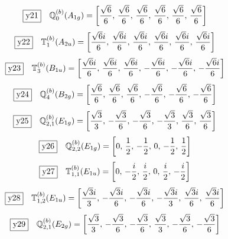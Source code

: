 \documentclass[fleqn,10pt,landscape]{jsarticle}
\begin{document}
\begin{dmath*}
\fbox{y21}\quad \mathbb{Q}_{0}^{(b)}(A_{1g})=\left[ \frac{\sqrt{6}}{6},\, \frac{\sqrt{6}}{6},\, \frac{\sqrt{6}}{6},\, \frac{\sqrt{6}}{6},\, \frac{\sqrt{6}}{6},\, \frac{\sqrt{6}}{6} \right]
\end{dmath*}
\begin{dmath*}
\fbox{y22}\quad \mathbb{T}_{1}^{(b)}(A_{2u})=\left[ \frac{\sqrt{6} i}{6},\, \frac{\sqrt{6} i}{6},\, \frac{\sqrt{6} i}{6},\, \frac{\sqrt{6} i}{6},\, \frac{\sqrt{6} i}{6},\, \frac{\sqrt{6} i}{6} \right]
\end{dmath*}
\begin{dmath*}
\fbox{y23}\quad \mathbb{T}_{3}^{(b)}(B_{1u})=\left[ \frac{\sqrt{6} i}{6},\, \frac{\sqrt{6} i}{6},\, \frac{\sqrt{6} i}{6},\, - \frac{\sqrt{6} i}{6},\, - \frac{\sqrt{6} i}{6},\, - \frac{\sqrt{6} i}{6} \right]
\end{dmath*}
\begin{dmath*}
\fbox{y24}\quad \mathbb{Q}_{4}^{(b)}(B_{2g})=\left[ \frac{\sqrt{6}}{6},\, \frac{\sqrt{6}}{6},\, \frac{\sqrt{6}}{6},\, - \frac{\sqrt{6}}{6},\, - \frac{\sqrt{6}}{6},\, - \frac{\sqrt{6}}{6} \right]
\end{dmath*}
\begin{dmath*}
\fbox{y25}\quad \mathbb{Q}_{2,1}^{(b)}(E_{1g})=\left[ \frac{\sqrt{3}}{3},\, - \frac{\sqrt{3}}{6},\, - \frac{\sqrt{3}}{6},\, - \frac{\sqrt{3}}{3},\, \frac{\sqrt{3}}{6},\, \frac{\sqrt{3}}{6} \right]
\end{dmath*}
\begin{dmath*}
\fbox{y26}\quad \mathbb{Q}_{2,2}^{(b)}(E_{1g})=\left[ 0,\, \frac{1}{2},\, - \frac{1}{2},\, 0,\, - \frac{1}{2},\, \frac{1}{2} \right]
\end{dmath*}
\begin{dmath*}
\fbox{y27}\quad \mathbb{T}_{1,1}^{(b)}(E_{1u})=\left[ 0,\, - \frac{i}{2},\, \frac{i}{2},\, 0,\, \frac{i}{2},\, - \frac{i}{2} \right]
\end{dmath*}
\begin{dmath*}
\fbox{y28}\quad \mathbb{T}_{1,2}^{(b)}(E_{1u})=\left[ \frac{\sqrt{3} i}{3},\, - \frac{\sqrt{3} i}{6},\, - \frac{\sqrt{3} i}{6},\, - \frac{\sqrt{3} i}{3},\, \frac{\sqrt{3} i}{6},\, \frac{\sqrt{3} i}{6} \right]
\end{dmath*}
\begin{dmath*}
\fbox{y29}\quad \mathbb{Q}_{2,1}^{(b)}(E_{2g})=\left[ \frac{\sqrt{3}}{3},\, - \frac{\sqrt{3}}{6},\, - \frac{\sqrt{3}}{6},\, \frac{\sqrt{3}}{3},\, - \frac{\sqrt{3}}{6},\, - \frac{\sqrt{3}}{6} \right]
\end{dmath*}
\end{document}
